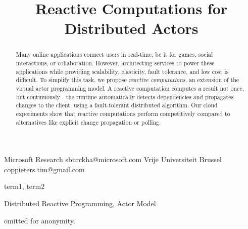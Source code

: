 \documentclass[preprint,numbers,10pt]{sigplanconf}
\begin{document}
\setlength{\pdfpageheight}{\paperheight}
\setlength{\pdfpagewidth}{\paperwidth}




\title{Reactive Computations for Distributed Actors}
\subtitle{}

           {Microsoft Research}
           {sburckha@microsoft.com}
           {Vrije Universiteit Brussel}
           {coppieters.tim@gmail.com}

\maketitle

\begin{abstract}
Many online applications connect users in real-time, be it for games, social interactions, or collaboration. However, architecting services to power these applications while providing scalability, elasticity, fault tolerance, and low cost is difficult. To simplify this task, we propose \emph{reactive computations}, an extension of the virtual actor programming model. A reactive computation computes a result not once, but continuously - the runtime automatically detects dependencies and propagates changes to the client, using a fault-tolerant distributed algorithm. Our cloud experiments show that reactive computations perform competitively compared to alternatives like explicit change propagation or polling. 
\end{abstract}


\terms
term1, term2

\keywords
Distributed Reactive Programming,
Actor Model








 

 

\acks

omitted for anonymity.






\end{document}

